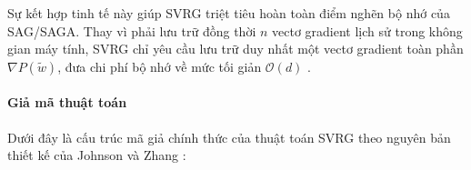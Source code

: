 Sự kết hợp tinh tế này giúp SVRG triệt tiêu hoàn toàn điểm nghẽn bộ nhớ của SAG/SAGA. Thay vì phải lưu trữ đồng thời $n$ vectơ gradient lịch sử trong không gian máy tính, SVRG chỉ yêu cầu lưu trữ duy nhất một vectơ gradient toàn phần $\nabla P(\tilde{w})$, đưa chi phí bộ nhớ về mức tối giản $\mathcal{O}(d)$ \cite{johnson2013accelerating}.



\paragraph{Giả mã thuật toán}



Dưới đây là cấu trúc mã giả chính thức của thuật toán SVRG theo nguyên bản thiết kế của Johnson và Zhang \cite{johnson2013accelerating}:



\begin{algorithm}[H]

\SetAlgoLined


\BlankLine
{}

\caption{Thuật toán Stochastic Variance Reduced Gradient (SVRG)}

\label{alg:svrg}

\end{algorithm}


